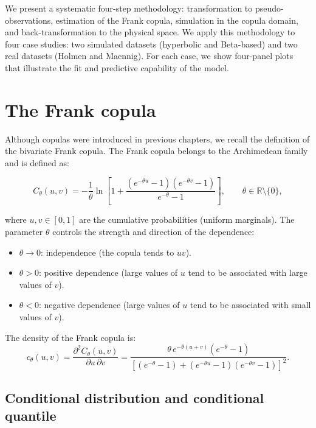 We present a systematic four-step methodology: transformation to pseudo-observations, estimation of the Frank copula, simulation in the copula domain, and back-transformation to the physical space. We apply this methodology to four case studies: two simulated datasets (hyperbolic and Beta-based) and two real datasets (Holmen and Maennig). For each case, we show four-panel plots that illustrate the fit and predictive capability of the model.

\section{The Frank copula}
\label{sec:frank-copula}

Although copulas were introduced in previous chapters, we recall the definition of the bivariate Frank copula. The Frank copula belongs to the Archimedean family and is defined as:

\begin{equation}
C_\theta(u,v) = -\frac{1}{\theta} \ln\left[1 + \frac{(e^{-\theta u} - 1)(e^{-\theta v} - 1)}{e^{-\theta} - 1}\right], \qquad \theta \in \mathbb{R}\setminus\{0\},
\label{eq:frank-copula}
\end{equation}

where \(u,v \in [0,1]\) are the cumulative probabilities (uniform marginals). The parameter \(\theta\) controls the strength and direction of the dependence:

\begin{itemize}
    \item \(\theta \to 0\): independence (the copula tends to \(uv\)).
    \item \(\theta > 0\): positive dependence (large values of \(u\) tend to be associated with large values of \(v\)).
    \item \(\theta < 0\): negative dependence (large values of \(u\) tend to be associated with small values of \(v\)).
\end{itemize}

The density of the Frank copula is:
\[
c_\theta(u,v) = \frac{\partial^2 C_\theta(u,v)}{\partial u\,\partial v} = \frac{\theta\,e^{-\theta(u+v)}(e^{-\theta}-1)}{\left[(e^{-\theta}-1)+(e^{-\theta u}-1)(e^{-\theta v}-1)\right]^2}.
\]

\subsection{Conditional distribution and conditional quantile}

